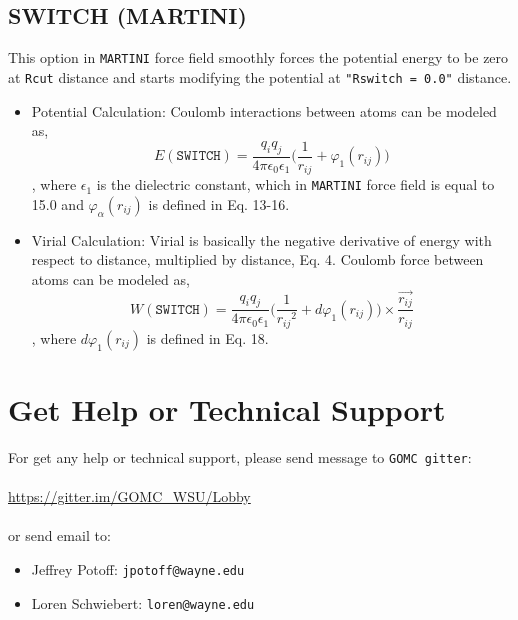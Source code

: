 \subsection{SWITCH (MARTINI)} This option in \texttt{MARTINI} force field smoothly forces the potential energy to be zero at \texttt{Rcut} distance and starts modifying the potential at \texttt{"Rswitch = 0.0"} distance.
\begin{itemize}
	\item Potential Calculation: Coulomb interactions between atoms can be modeled as,
	\begin{equation}
		E(\texttt{SWITCH}) = \frac{q_i q_j}{4\pi \epsilon_0 \epsilon_1} \bigg( \frac{1}{r_{ij}} + \varphi_{1} (r_{ij}) \bigg)
	\end{equation}
	, where $\epsilon_1$ is the dielectric constant, which in \texttt{MARTINI} force field is equal to 15.0 and $\varphi_{\alpha} (r_{ij})$ is defined in Eq. 13-16.
	
	\item Virial Calculation: Virial is basically the negative derivative of energy with respect to distance, multiplied by distance, Eq. 4. Coulomb force between atoms can be modeled as,\\
	\begin{equation}
		W(\texttt{SWITCH}) =  \frac{q_i q_j}{4\pi \epsilon_0 \epsilon_1} \bigg( \frac{1}{{r_{ij}}^2} + d\varphi_1 (r_{ij})  \bigg) \times \frac{\overrightarrow{r_{ij}}}{r_{ij}}
	\end{equation}
	, where $d\varphi_1 (r_{ij})$ is defined in Eq. 18.	
\end{itemize}
\newpage

\section{Get Help or Technical Support }

For get any help or technical support, please send message to \texttt{GOMC gitter}:\\\\
\url{https://gitter.im/GOMC_WSU/Lobby} \\\\
or send email to:\\
\begin{itemize}

	\item Jeffrey Potoff:  \texttt{jpotoff@wayne.edu}
	\item Loren Schwiebert: \texttt{loren@wayne.edu}
	
\end{itemize}


